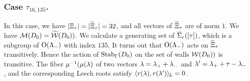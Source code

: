 \documentclass{amsart} %
\begin{document}
\subsubsection{Case $\tau_{16, 135}$.}
In this case,
we have $|\Xi_{\tau}|=|\widetilde{\Xi}_{\tau}|=32$,
and all vectors of $\widetilde{\Xi}_{\tau}$ are of norm $1$.
We have $\mathord{\mathcal{M}}(D_0)=\widetilde{\mathord{\mathcal{W}}}(D_0))$.
We calculate a generating set of $\overline{\Sigma}_{\varepsilon} ([\tau])$,
which is a subgroup of $ \mathord{\mathrm{O}}(\Lambda_{-})$ with index $135$.
It turns out that $ \mathord{\mathrm{O}}(\Lambda_{-})$ acts on $\widetilde{\Xi}_{\tau}$ transitively.
Hence the action of $\operatorname{Stab}_{\Gamma}(D_0)$ on the set of walls $\mathord{\mathcal{W}}(D_0))$ is transitive.
The fiber 
 $\mu^{-1}(\mu(\lambda)$ 
of two vectors
$\lambda={\lambda}_{+}+{\lambda}_{-}$ and $\lambda^{\prime}={\lambda}_{+}+\tau-{\lambda}_{-}$, and 
the corresponding Leech roots 
 satisfy
$\langle r(\lambda), r(\lambda^{\prime}) \rangle_{\hskip -1pt L}=0$.
%
%
%



%
\end{document}

